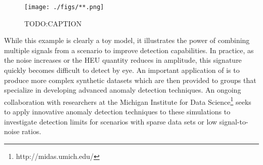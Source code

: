 \begin{figure}%
\begin{center}
\texttt{[image: ./figs/**.png]}
\end{center}
\caption{TODO:CAPTION}
\label{fig:time_series}
\end{figure}

While this example is clearly a toy model, it illustrates the power of combining multiple signals from a scenario to improve detection capabilities. In practice, as the noise increases or the \gls{HEU} quantity reduces in amplitude, this signature quickly becomes difficult to detect by eye. An important application of \Cyclus is to produce more complex synthetic datasets which are then provided to groups that specialize in developing advanced anomaly detection techniques. An ongoing collaboration with researchers at the Michigan Institute for Data Science\footnote{http://midas.umich.edu/} seeks to apply innovative anomaly detection techniques to these simulations to investigate detection limits for scenarios with sparse data sets or low signal-to-noise ratios.

